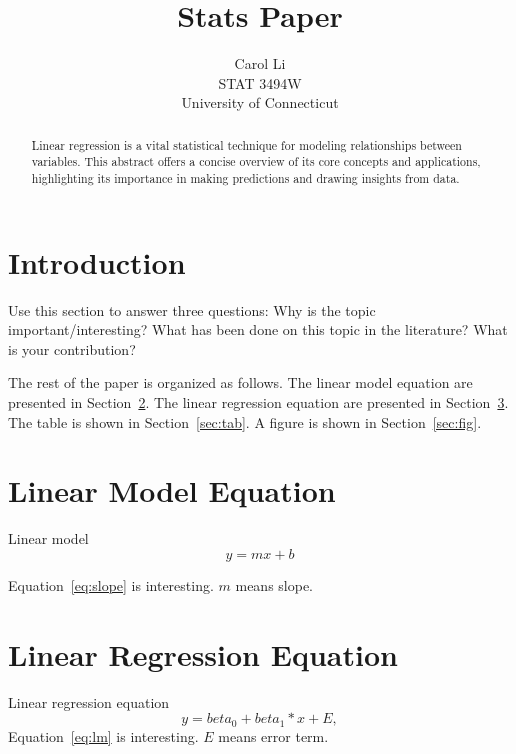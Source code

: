 \documentclass[12pt]{article}
\title{Stats Paper}
\author{Carol Li\\
    STAT 3494W\\
    University of Connecticut
}
\begin{document}

\begin{abstract}
  Linear regression is a vital statistical technique for modeling relationships between variables. 
  This abstract offers a concise overview of its core concepts and applications, highlighting its importance 
  in making predictions and drawing insights from data.
\end{abstract}


\section{Introduction}
\label{sec:intro}

Use this section to answer three questions:
Why is the topic important/interesting?
What has been done on this topic in the literature?
What is your contribution?

\lipsum[1]


The rest of the paper is organized as follows.
The linear model equation are presented in Section~\ref{sec:eq}.
The linear regression equation are presented in Section~\ref{sec:eq2}.
The table is shown in Section~\ref{sec:tab}.
A figure is shown in Section~\ref{sec:fig}.


\section{Linear Model Equation}
\label{sec:eq}

Linear model
\begin{equation}
  \label{slope}
  y = mx + b
\end{equation}

Equation~\eqref{eq:slope} is interesting. $m$ means slope.  

\section{Linear Regression Equation}
\label{sec:eq2}

Linear regression equation
\begin{equation}
  \label{eq:lm}
  y = beta_0 + beta_1*x + E,
\end{equation}
Equation~\eqref{eq:lm} is interesting. $E$ means error term.  

\lipsum[2]
\end{document}
